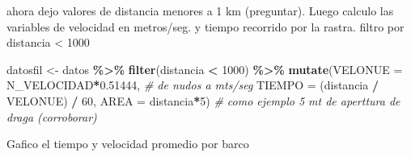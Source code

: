 \documentclass[
]{article}
\newenvironment{Shaded}{\begin{snugshade}}{\end{snugshade}}
\newcommand{\AttributeTok}[1]{\textcolor[rgb]{0.13,0.29,0.53}{#1}}
\newcommand{\CommentTok}[1]{\textcolor[rgb]{0.56,0.35,0.01}{\textit{#1}}}
\newcommand{\ConstantTok}[1]{\textcolor[rgb]{0.56,0.35,0.01}{#1}}
\newcommand{\DecValTok}[1]{\textcolor[rgb]{0.00,0.00,0.81}{#1}}
\newcommand{\FloatTok}[1]{\textcolor[rgb]{0.00,0.00,0.81}{#1}}
\newcommand{\FunctionTok}[1]{\textcolor[rgb]{0.13,0.29,0.53}{\textbf{#1}}}
\newcommand{\NormalTok}[1]{#1}
\newcommand{\OtherTok}[1]{\textcolor[rgb]{0.56,0.35,0.01}{#1}}
\newcommand{\SpecialCharTok}[1]{\textcolor[rgb]{0.81,0.36,0.00}{\textbf{#1}}}
\begin{document}
\begin{Shaded}
\end{Shaded}

ahora dejo valores de distancia menores a 1 km (preguntar). Luego calculo las variables de velocidad en metros/seg. y tiempo recorrido por la rastra. filtro por distancia \textless{} 1000

\begin{Shaded}
\begin{Highlighting}[]
\NormalTok{datosfil }\OtherTok{\textless{}{-}}\NormalTok{ datos }\SpecialCharTok{\%\textgreater{}\%} 
  \FunctionTok{filter}\NormalTok{(distancia }\SpecialCharTok{\textless{}} \DecValTok{1000}\NormalTok{) }\SpecialCharTok{\%\textgreater{}\%} 
  \FunctionTok{mutate}\NormalTok{(}\AttributeTok{VELONUE =}\NormalTok{ N\_VELOCIDAD}\SpecialCharTok{*}\FloatTok{0.51444}\NormalTok{, }\CommentTok{\# de nudos a mts/seg}
         \AttributeTok{TIEMPO =}\NormalTok{ (distancia }\SpecialCharTok{/}\NormalTok{ VELONUE) }\SpecialCharTok{/} \DecValTok{60}\NormalTok{,}
         \AttributeTok{AREA =}\NormalTok{ distancia}\SpecialCharTok{*}\DecValTok{5}\NormalTok{) }\CommentTok{\# como ejemplo 5 mt de aperttura de draga (corroborar)}
\end{Highlighting}
\end{Shaded}

Gafico el tiempo y velocidad promedio por barco
\end{document}
